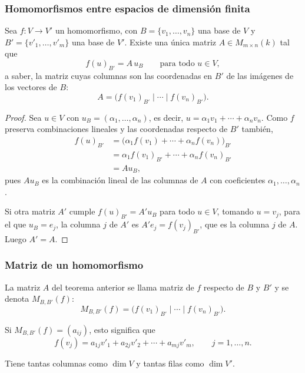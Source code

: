 \begin{frame}[allowframebreaks, t]
    \frametitle{Homomorfismos entre espacios de dimensión finita}

    \begin{theorem}
        Sea $f\colon V\to V'$ un homomorfismo, con
        $B=\{v_1,\ldots,v_n\}$ una base de $V$ y
        $B'=\{v'_1,\ldots,v'_m\}$ una base de $V'$. Existe una única matriz
        $A\in M_{m\times n}(k)$ tal que
        \[
            f(u)_{B'}=A\,u_B\qquad\text{para todo }u\in V,
        \]
        a saber, la matriz cuyas columnas son las coordenadas en $B'$ de las
        imágenes de los vectores de $B$:
        \[
            A=\bigl(f(v_1)_{B'}\mid\cdots\mid f(v_n)_{B'}\bigr).
        \]
    \end{theorem}

    \framebreak

    \begin{proof}
        Sea $u\in V$ con $u_B=(\alpha_1,\ldots,\alpha_n)$, es decir,
        $u=\alpha_1v_1+\cdots+\alpha_nv_n$. Como $f$ preserva combinaciones
        lineales y las coordenadas respecto de $B'$ también,
        \begin{align*}
            f(u)_{B'}&=\bigl(\alpha_1f(v_1)+\cdots+\alpha_nf(v_n)\bigr)_{B'}\\
            &=\alpha_1f(v_1)_{B'}+\cdots+\alpha_nf(v_n)_{B'}\\
            &=Au_B,
        \end{align*}
        pues $Au_B$ es la combinación lineal de las columnas de $A$ con
        coeficientes $\alpha_1,\ldots,\alpha_n$.

        Si otra matriz $A'$ cumple $f(u)_{B'}=A'u_B$ para todo $u\in V$,
        tomando $u=v_j$, para el que $u_B=e_j$, la columna $j$ de $A'$ es
        $A'e_j=f(v_j)_{B'}$, que es la columna $j$ de $A$. Luego $A'=A$.
    \end{proof}
\end{frame}


\begin{frame}
    \frametitle{Matriz de un homomorfismo}

    \begin{definition}
        La matriz $A$ del teorema anterior se llama \alert{matriz de $f$
        respecto de $B$ y $B'$} y se denota $M_{B,B'}(f)$:
        \[
            M_{B,B'}(f)=\bigl(f(v_1)_{B'}\mid\cdots\mid f(v_n)_{B'}\bigr).
        \]
    \end{definition}

    \medskip

    Si $M_{B,B'}(f)=(a_{ij})$, esto significa que
    \[
        f(v_j)=a_{1j}v'_1+a_{2j}v'_2+\cdots+a_{mj}v'_m,
        \qquad j=1,\ldots,n.
    \]

    \medskip

    Tiene tantas columnas como $\dim V$ y tantas filas como $\dim V'$.
\end{frame}


